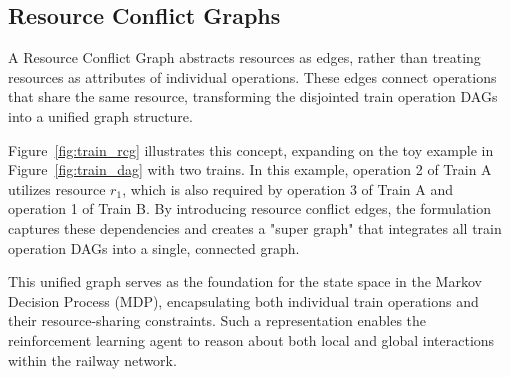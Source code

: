 \documentclass[runningheads]{llncs}
\begin{document}
\subsection{Resource Conflict Graphs}
\label{sss:resource_conflicts}
A Resource Conflict Graph abstracts resources as edges, rather than treating resources as attributes of individual operations.
These edges connect operations that share the same resource, transforming the disjointed train operation DAGs into a unified graph structure. 

Figure~\ref{fig:train_rcg} illustrates this concept, expanding on the toy example in Figure~\ref{fig:train_dag} with two trains. 
In this example, operation 2 of Train A utilizes resource $r_1$, which is also required by operation 3 of Train A and operation 1 of Train B. 
By introducing resource conflict edges, the formulation captures these dependencies and creates a "super graph" that integrates all train operation DAGs into a single, connected graph.

This unified graph serves as the foundation for the state space in the Markov Decision Process (MDP), encapsulating both individual train operations and their resource-sharing constraints. 
Such a representation enables the reinforcement learning agent to reason about both local and global interactions within the railway network.
\end{document}

